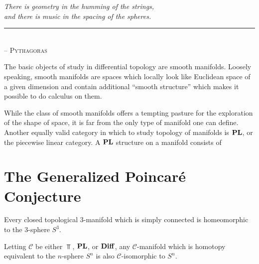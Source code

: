 \begin{flushleft}
	\textsl{There is geometry in the humming of the strings,}\\
	\textsl{and there is music in the spacing of the spheres.}\\
	\rule[0pt]{21em}{0.5pt}\\
	-- \textsc{Pythagoras}\\
	\vspace{2em}
\end{flushleft}

The basic objects of study in differential topology are smooth manifolds. Loosely speaking, smooth manifolds are spaces which locally look like Euclidean space of a given dimension and contain additional ``smooth structure'' which makes it possible to do calculus on them.

\begin{definition}
\end{definition}



While the class of smooth manifolds offers a tempting pasture for the exploration of the shape of space, it is far from the only type of manifold one can define. Another equally valid category in which to study topology of manifolds is $\mathbf{PL}$, or the piecewise linear category. A $\mathbf{PL}$ structure on a manifold consists of 

\section{The Generalized Poincar\'e Conjecture}

\begin{conjecture}
 Every closed topological $3$-manifold which is simply connected is homeomorphic to the $3$-sphere $S^3$.
\end{conjecture}

\begin{conjecture}
  Letting $\mathscr{C}$ be either $\Top$, $\mathbf{PL}$, or $\mathbf{Diff}$, any $\mathscr{C}$-manifold which is homotopy equivalent to the $n$-sphere $S^n$ is also $\mathscr{C}$-isomorphic to $S^n$.
\end{conjecture}

